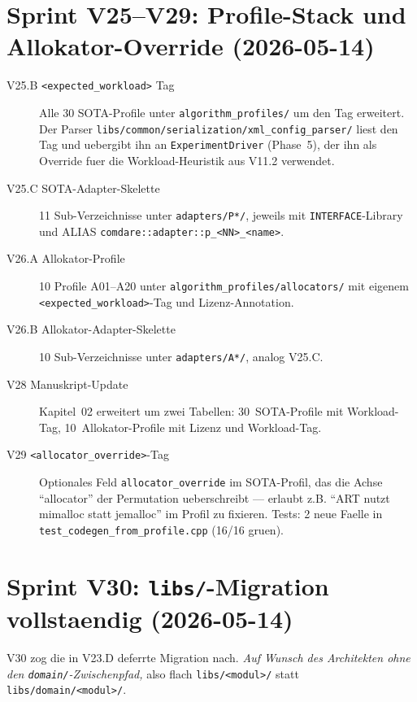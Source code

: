 \section{Sprint V25--V29: Profile-Stack und Allokator-Override (2026-05-14)}

\begin{description}
    \item[V25.B \texttt{<expected\_workload>} Tag] Alle 30 SOTA-Profile
          unter \texttt{algorithm\_profiles/} um den Tag erweitert. Der
          Parser \texttt{libs/common/serialization/xml\_config\_parser/}
          liest den Tag und uebergibt ihn an \texttt{ExperimentDriver}
          (Phase~5), der ihn als Override fuer die Workload-Heuristik
          aus V11.2 verwendet.
    \item[V25.C SOTA-Adapter-Skelette] 11 Sub-Verzeichnisse unter
          \texttt{adapters/P*/}, jeweils mit \texttt{INTERFACE}-Library
          und ALIAS \texttt{comdare::adapter::p\_<NN>\_<name>}.
    \item[V26.A Allokator-Profile] 10 Profile A01--A20 unter
          \texttt{algorithm\_profiles/allocators/} mit eigenem
          \texttt{<expected\_workload>}-Tag und Lizenz-Annotation.
    \item[V26.B Allokator-Adapter-Skelette] 10 Sub-Verzeichnisse unter
          \texttt{adapters/A*/}, analog V25.C.
    \item[V28 Manuskript-Update] Kapitel~02 erweitert um zwei Tabellen:
          30~SOTA-Profile mit Workload-Tag, 10~Allokator-Profile mit
          Lizenz und Workload-Tag.
    \item[V29 \texttt{<allocator\_override>}-Tag] Optionales Feld
          \texttt{allocator\_override} im SOTA-Profil, das die Achse
          ``allocator'' der Permutation ueberschreibt --- erlaubt z.B.
          ``ART nutzt mimalloc statt jemalloc'' im Profil zu fixieren.
          Tests: 2 neue Faelle in
          \texttt{test\_codegen\_from\_profile.cpp} (16/16 gruen).
\end{description}

\section{Sprint V30: \texttt{libs/}-Migration vollstaendig (2026-05-14)}

V30 zog die in V23.D deferrte Migration nach. \emph{Auf Wunsch des
Architekten ohne den \texttt{domain/}-Zwischenpfad,} also flach
\texttt{libs/<modul>/} statt \texttt{libs/domain/<modul>/}.

